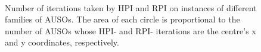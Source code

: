 \begin{figure}[t]
\centering%
\mbox{
%
%
}
\mbox{
%
%
}
\caption{Number of iterations taken by HPI and RPI on instances of different families of AUSOs. The area of each circle is proportional to the number of AUSOs whose HPI- and RPI- iterations are the centre's x and y coordinates, respectively. %
}
\label{fig:3-4-auso-bounds}
\end{figure}


